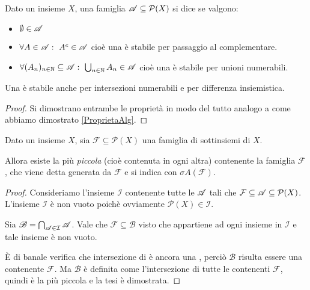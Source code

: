 \begin{definition}[\sigalg{}]
	Dato un insieme $X$, una famiglia $\mathscr A\subseteq\mathcal P(X)$ si dice \sigalg{} se valgono:
	\begin{itemize}
	\item $\emptyset\in \mathscr A$
	\item $\forall A\in \mathscr A:\ A^c\in \mathscr A$ cioè una \sigalg{} è stabile per passaggio al complementare.
	\item $\forall (A_n)_{n\in\N}\subseteq \A:\ \bigcup_{n\in\N} A_n\in \A$ cioè una \sigalg{} è stabile per unioni numerabili.  
	\end{itemize}
\end{definition}

\begin{remark}\label{ProprietaSigAlg}
	Una \sigalg{} è stabile anche per intersezioni numerabili e per differenza insiemistica.
\end{remark}
\begin{proof}
	Si dimostrano entrambe le proprietà in modo del tutto analogo a come abbiamo dimostrato \cref{ProprietaAlg}.
\end{proof}

\begin{proposition}\label{SigmaAlgGenerata}
	Dato un insieme $X$, sia $\mathcal F\subseteq\mathcal P(X)$ una famiglia di sottinsiemi di $X$.
	
	Allora esiste la più \emph{piccola} (cioè contenuta in ogni altra) \sigalg{} contenente la famiglia $\mathcal F$, che viene detta \sigalg{} generata da $\mathcal F$ e si indica con $\sigma A(\mathcal F)$.
\end{proposition}
\begin{proof}
	Consideriamo l'insieme $\mathcal I$ contenente tutte le \sigalg[e] $\mathscr A$ tali che $\mathcal F\subseteq \mathscr A \subseteq \mathcal P(X)$.
	L'insieme $\mathcal I$ è non vuoto poichè ovviamente $\mathcal P(X)\in\mathcal I$.
	
	Sia $\mathscr B=\bigcap_{\mathscr A\in\mathcal I} \mathscr A$.
	Vale che $\mathcal F\subseteq \mathscr B$ visto che appartiene ad ogni insieme in $\mathcal I$ e tale insieme è non vuoto.
	
	È di banale verifica che intersezione di \sigalg[e] è ancora una \sigalg{}, perciò $\mathscr B$ risulta essere una \sigalg{} contenente $\mathcal F$. Ma $\mathscr B$ è definita come l'intersezione di tutte le \sigalg{} contenenti $\mathcal F$, quindi è la più piccola e la tesi è dimostrata.
\end{proof}


